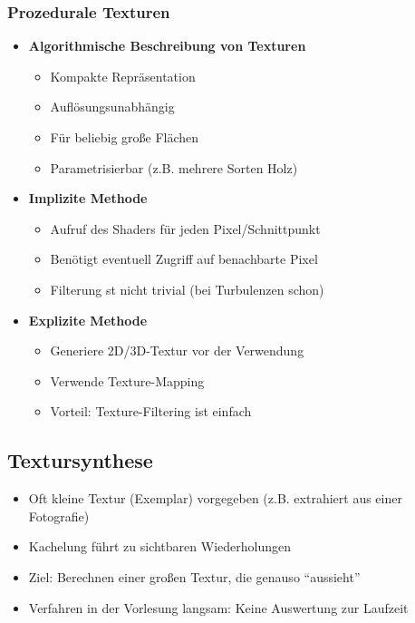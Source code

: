 \subsubsection{Prozedurale Texturen}
\begin{itemize}
	\item \textbf{Algorithmische Beschreibung von Texturen}
	\begin{itemize}
		\item Kompakte Repräsentation
		\item Auflösungsunabhängig
		\item Für beliebig große Flächen
		\item Parametrisierbar (z.B. mehrere Sorten Holz)
	\end{itemize}
	\item \textbf{Implizite Methode}
	\begin{itemize}
		\item Aufruf des Shaders für jeden Pixel/Schnittpunkt
		\item Benötigt eventuell Zugriff auf benachbarte Pixel
		\item Filterung st nicht trivial (bei Turbulenzen schon)
	\end{itemize}
	\item \textbf{Explizite Methode}
	\begin{itemize}
		\item Generiere 2D/3D-Textur vor der Verwendung
		\item Verwende Texture-Mapping
		\item Vorteil: Texture-Filtering ist einfach
	\end{itemize}
\end{itemize}


\subsection{Textursynthese}
\begin{itemize}
	\item Oft kleine Textur (Exemplar) vorgegeben (z.B. extrahiert aus einer Fotografie)
	\item Kachelung führt zu sichtbaren Wiederholungen
	\item Ziel: Berechnen einer großen Textur, die genauso "`aussieht"'
	\item Verfahren in der Vorlesung langsam: Keine Auswertung zur Laufzeit
\end{itemize}

